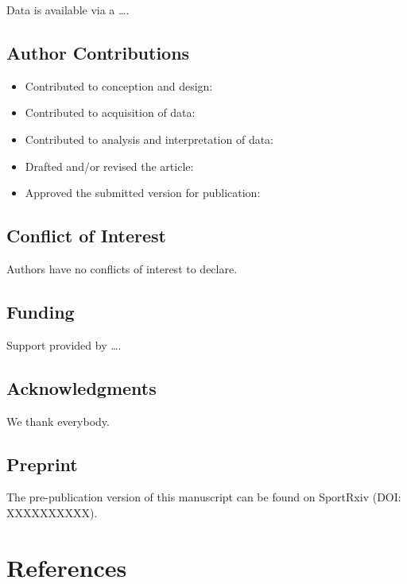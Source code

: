 \documentclass[]{cik}%
\begin{document}
Data is available via a \ldots.

\hypertarget{author-contributions}{%
\subsection{Author Contributions}\label{author-contributions}}

\begin{itemize}
\tightlist
\item
  Contributed to conception and design:
\item
  Contributed to acquisition of data:
\item
  Contributed to analysis and interpretation of data:
\item
  Drafted and/or revised the article:
\item
  Approved the submitted version for publication:
\end{itemize}

\hypertarget{conflict-of-interest}{%
\subsection{Conflict of Interest}\label{conflict-of-interest}}

Authors have no conflicts of interest to declare.

\hypertarget{funding}{%
\subsection{Funding}\label{funding}}

Support provided by \ldots.

\hypertarget{acknowledgments}{%
\subsection{Acknowledgments}\label{acknowledgments}}

We thank everybody.

\hypertarget{preprint}{%
\subsection{Preprint}\label{preprint}}

The pre-publication version of this manuscript can be found on SportRxiv
(DOI: XXXXXXXXXX).

\newpage

\hypertarget{references}{%
\section{References}\label{references}}
\end{document}
